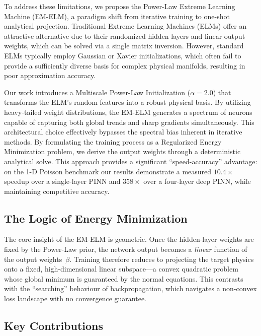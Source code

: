 \documentclass[final,12pt,3p,times,fleqn]{elsarticle}
\begin{document}
To address these limitations, we propose the Power-Law Extreme Learning Machine (EM-ELM), a paradigm shift from iterative training to one-shot analytical projection. Traditional Extreme Learning Machines (ELMs) offer an attractive alternative due to their randomized hidden layers and linear output weights, which can be solved via a single matrix inversion. However, standard ELMs typically employ Gaussian or Xavier initializations, which often fail to provide a sufficiently diverse basis for complex physical manifolds, resulting in poor approximation accuracy.

Our work introduces a Multiscale Power-Law Initialization ($\alpha=2.0$) that transforms the ELM's random features into a robust physical basis. By utilizing heavy-tailed weight distributions, the EM-ELM generates a spectrum of neurons capable of capturing both global trends and sharp gradients simultaneously. This architectural choice effectively bypasses the spectral bias inherent in iterative methods. By formulating the training process as a Regularized Energy Minimization problem, we derive the output weights through a deterministic analytical solve. This approach provides a significant ``speed-accuracy'' advantage: on the 1-D Poisson benchmark our results demonstrate a measured $10.4\times$ speedup over a single-layer PINN and $358\times$ over a four-layer deep PINN, while maintaining competitive accuracy.

\subsection{The Logic of Energy Minimization}

The core insight of the EM-ELM is geometric. Once the hidden-layer weights are fixed by the Power-Law prior, the network output becomes a \emph{linear} function of the output weights~$\beta$. Training therefore reduces to projecting the target physics onto a fixed, high-dimensional linear subspace---a convex quadratic problem whose global minimum is guaranteed by the normal equations. This contrasts with the ``searching'' behaviour of backpropagation, which navigates a non-convex loss landscape with no convergence guarantee.

\subsection{Key Contributions}
\end{document}
